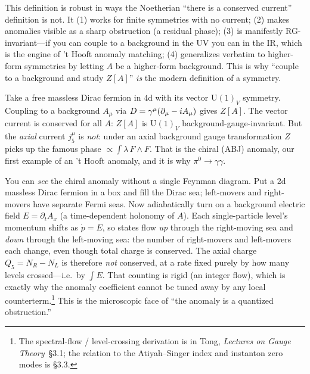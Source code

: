 \documentclass[11pt]{article}
\newcommand{\Uone}{\mathrm{U}(1)}
\begin{document}
\begin{iintuition}
This definition is robust in ways the Noetherian ``there is a conserved current''
definition is not. It (1) works for finite symmetries with no current; (2) makes
anomalies visible as a sharp obstruction (a residual phase); (3) is manifestly
RG-invariant---if you can couple to a background in the UV you can in the IR, which is
the engine of 't Hooft anomaly matching; (4) generalizes verbatim to higher-form
symmetries by letting $A$ be a higher-form background. This is why ``couple to a
background and study $Z[A]$'' \emph{is} the modern definition of a symmetry.
\end{iintuition}

\begin{eexample}[Free Dirac fermion in a background $\Uone$]
Take a free massless Dirac fermion in $4$d with its vector $\Uone_V$ symmetry. Coupling
to a background $A_\mu$ via $\sl{D} = \gamma^\mu(\partial_\mu - iA_\mu)$ gives
$Z[A]$. The vector current is conserved for all $A$: $Z[A]$ is $\Uone_V$
background-gauge-invariant. But the \emph{axial} current $j_5^\mu$ is \emph{not}: under
an axial background gauge transformation $Z$ picks up the famous phase
$\propto \int \lambda\, F\wedge F$. That is the chiral (ABJ) anomaly, our first example
of an 't Hooft anomaly, and it is why $\pi^0\to\gamma\gamma$.
\end{eexample}

\begin{iintuition}
You can \emph{see} the chiral anomaly without a single Feynman diagram. Put a $2$d
massless Dirac fermion in a box and fill the Dirac sea; left-movers and right-movers have
separate Fermi seas. Now adiabatically turn on a background electric field
$E=\partial_t A_x$ (a time-dependent holonomy of $A$). Each single-particle level's
momentum shifts as $\dot p = E$, so states flow \emph{up} through the right-moving sea
and \emph{down} through the left-moving sea: the number of right-movers and left-movers
each change, even though total charge is conserved. The axial charge
$Q_5=N_R-N_L$ is therefore \emph{not} conserved, at a rate fixed purely by how many
levels crossed---i.e.\ by $\int E$. That counting is rigid (an integer flow), which is
exactly why the anomaly coefficient cannot be tuned away by any local counterterm.\footnote{The
spectral-flow / level-crossing derivation is in Tong, \emph{Lectures on Gauge
Theory}~\S3.1; the relation to the Atiyah--Singer index and instanton zero modes is
\S3.3.} This is the microscopic face of ``the anomaly is a quantized obstruction.''
\end{iintuition}
\end{document}
